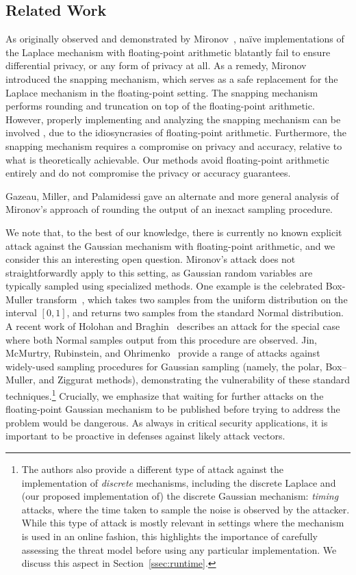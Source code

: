 \documentclass{jpc}
\begin{document}
\subsection{Related Work}
As originally observed and demonstrated by Mironov~\citep{Mironov12}, na\"ive implementations of the Laplace mechanism with floating-point arithmetic blatantly fail to ensure differential privacy, or any form of privacy at all. As a remedy, Mironov introduced the snapping mechanism, which serves as a safe replacement for the Laplace mechanism in the floating-point setting. The snapping mechanism performs rounding and truncation on top of the floating-point arithmetic. However, properly implementing and analyzing the snapping mechanism can be involved \citep{Covington19}, due to the idiosyncrasies of floating-point arithmetic. Furthermore, the snapping mechanism requires a compromise on privacy and accuracy, relative to what is theoretically achievable. Our methods avoid floating-point arithmetic entirely and do not compromise the privacy or accuracy guarantees.

Gazeau, Miller, and Palamidessi \cite{GazeauMP16} gave an alternate and more general analysis of Mironov's approach of rounding the output of an inexact sampling procedure.

We note that, to the best of our knowledge, there is currently no known explicit attack against the Gaussian mechanism with floating-point arithmetic, and we consider this an interesting open question. 
Mironov's attack does not straightforwardly apply to this setting, as Gaussian random variables are typically sampled using specialized methods. 
One example is the celebrated Box-Muller transform~\cite{BoxM58}, which takes two samples from the uniform distribution on the interval $[0,1]$, and returns two samples from the standard Normal distribution.
A recent work of Holohan and Braghin~\cite{HolohanB21} describes an attack for the special case where both Normal samples output from this procedure are observed.
Jin, McMurtry, Rubinstein, and Ohrimenko~\cite{JinMRO21} provide a range of attacks against widely-used sampling procedures for Gaussian sampling (namely, the polar, Box--Muller, and Ziggurat methods), demonstrating the vulnerability of these standard techniques.\footnote{The authors also provide a different type of attack against the implementation of \emph{discrete} mechanisms, including the discrete Laplace and (our proposed implementation of) the discrete Gaussian mechanism: \emph{timing} attacks, where the time taken to sample the noise is observed by the attacker. While this type of attack is mostly relevant in settings where the mechanism is used in an online fashion, this highlights the importance of carefully assessing the threat model before using any particular implementation. We discuss this aspect in Section~\ref{ssec:runtime}.}
Crucially, we emphasize that waiting for further attacks on the floating-point Gaussian mechanism to be published before trying to address the problem would be dangerous. As always in critical security applications, it is important to be proactive in defenses against likely attack vectors.
\end{document}
